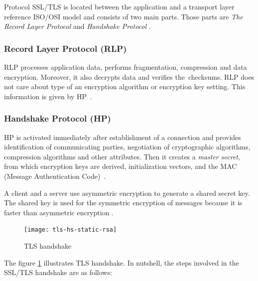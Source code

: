 \documentclass[
  12pt, 
  digital, %
  notable,   %
  nolof,     %
  nolot,     %
]{fithesis3}
\begin{document}
Protocol SSL/TLS is located between the application and a transport layer reference ISO/OSI model 
and consists of two main parts. Those parts are \textit{The Record Layer Protocol} and \textit{Handshake Protocol} \cite{oppliger2003security}. %

\subsubsection{Record Layer Protocol (RLP)}

RLP processes application data, performs fragmentation, compression and data encryption. Moreover, it also decrypts data and verifies the~checksums. RLP does not care about type of an encryption algorithm or encryption key setting. This information is given by HP~\cite{oppliger2003security}.

\subsubsection{Handshake Protocol (HP)}
HP is activated immediately after establishment of a connection and provides identification of 
communicating parties, negotiation of cryptographic algorithms, compression algorithms and other 
attributes. Then it creates a \textit{master secret}, from which encryption keys are derived, 
initialization vectors, and the MAC (Message Authentication Code)~\cite{oppliger2003security}. 

A client and a server use asymmetric encryption to generate a shared secret key. The shared key is used 
for the symmetric encryption of messages because it is faster than asymmetric encryption \cite{ibm}. 

\begin{figure}[th]
	\centering
	\texttt{[image: tls-hs-static-rsa]}
	\caption{TLS handshake \cite{tls-fig}}
	\label{fig:tls}
\end{figure}

The figure \ref{fig:tls} illustrates TLS handshake. In nutshell, the steps involved in  the SSL/TLS handshake are as follows:
\end{document}
